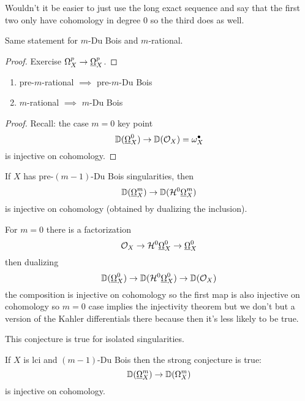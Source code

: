 \documentclass[12pt]{article}
\renewcommand{\cH}{\mathcal{H}}
\begin{document}
\begin{rmk}
Wouldn't it be easier to just use the long exact sequence and say that the first two only have cohomology in degree $0$ so the third does as well. 
\end{rmk}

\begin{cor}
Same statement for $m$-Du Bois and $m$-rational.
\end{cor}

\begin{proof}
Exercise $\Omega_X^p \to \underline{\Omega}_X^p$.
\end{proof}

\begin{theorem}
\begin{enumerate}
\item pre-$m$-rational $\implies$ pre-$m$-Du Bois
\item $m$-rational $\implies$ $m$-Du Bois
\end{enumerate}
\end{theorem}

\begin{proof}
Recall: the case $m = 0$ key point
\[ \mathbb{D}(\underline{\Omega}_X^0) \to \mathbb{D}(\mathcal{O}_{X}) = \omega_X^\bullet \]
is injective on cohomology.
\end{proof}

\begin{conj}
If $X$ has pre-$(m-1)$-Du Bois singularities, then
\[ \DD(\ulO_X^m) \to \DD(\cH^0 \ulO_X^m) \]
is injective on cohomology (obtained by dualizing the inclusion). 
\end{conj}

For $m = 0$ there is a factorization
\[ \struct{X} \to \cH^0 \ulO_X^0 \to \ulO_X^0 \]
then dualizing
\[ \DD(\ulO_X^0) \to \DD(\cH^0 \ulO_X^0) \to \DD(\struct{X}) \]
the composition is injective on cohomology so the first map is also injective on cohomology so $m = 0$ case implies the injectivity theorem but we don't but a version of the Kahler differentials there because then it's less likely to be true. 

\begin{theorem}
This conjecture is true for isolated singularities. 
\end{theorem}

\begin{theorem}
If $X$ is lci and $(m-1)$-Du Bois then the strong conjecture is true:
\[ \mathbb{D}(\underline{\Omega}_X^m) \to \mathbb{D}(\Omega_X^m) \]
is injective on cohomology. 
\end{theorem}
\end{document}
